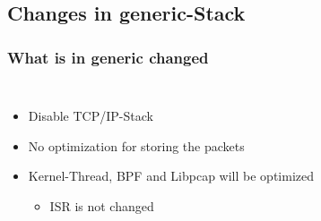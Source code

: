 \documentclass{beamer}
\begin{document}
\subsection*{Changes in generic-Stack}
\begin{frame}
\frametitle{What is in generic changed}
\begin{columns}
\begin{itemize}
	\item <2->Disable TCP/IP-Stack\newline
	\item <3->No optimization for storing the packets\newline
	\item <4->Kernel-Thread, BPF and Libpcap will be optimized\newline
		\begin{itemize}
			\item <4->ISR is not changed
		\end{itemize}
\end{itemize}
\vspace{-2em}

\end{columns}
\end{frame}
\end{document}
